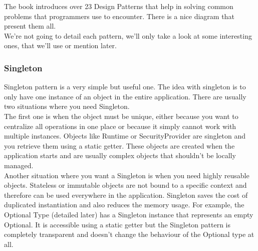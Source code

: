 The book introduces over 23 Design Patterns that help in solving common
problems that programmers use to encounter.
There is a nice diagram that present them all.
\\
\newline
We're not going to detail each pattern, we'll only take a look at some
interesting ones, that we'll use or mention later.

\subsubsection{Singleton}
Singleton pattern is a very simple but useful one.
The idea with singleton is to only have one instance of an object in the
entire application.
There are usually two situations where you need Singleton. \\
\newline
The first one is when the object must be unique, either because you want
to centralize all operations in one place or because it simply cannot
work with multiple instances.
Objects like Runtime or SecurityProvider are singleton and you retrieve
them using a static getter.
These objects are created when the application starts and are usually
complex objects that shouldn't be locally managed. \\
\newline
Another situation where you want a Singleton is when you need highly
reusable objects.
Stateless or immutable objects are not bound to a specific context and
therefore can be used everywhere in the application.
Singleton saves the cost of duplicated instantiation and also reduces the
memory usage.
For example, the Optional Type (detailed later) has a Singleton instance
that represents an empty Optional.
It is accessible using a static getter but the Singleton pattern is
completely transparent and doesn't change the behaviour of the Optional
type at all.

